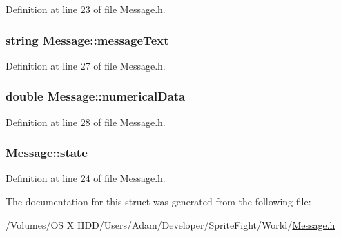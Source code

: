 Definition at line 23 of file Message.\-h.

\hypertarget{struct_message_a2ac401576d2c546a76a606ebc4f25b5b}{
\subsubsection[{message\-Text}]{\setlength{\rightskip}{0pt plus 5cm}string Message\-::message\-Text}}\label{struct_message_a2ac401576d2c546a76a606ebc4f25b5b}


Definition at line 27 of file Message.\-h.

\hypertarget{struct_message_acd1399cec6e65eabacd13e1d9962625b}{
\subsubsection[{numerical\-Data}]{\setlength{\rightskip}{0pt plus 5cm}double Message\-::numerical\-Data}}\label{struct_message_acd1399cec6e65eabacd13e1d9962625b}


Definition at line 28 of file Message.\-h.

\hypertarget{struct_message_a3ef0ded0ac200012123a6864acae590b}{
\subsubsection[{state}]{ Message\-::state}}\label{struct_message_a3ef0ded0ac200012123a6864acae590b}


Definition at line 24 of file Message.\-h.



The documentation for this struct was generated from the following file\-:\begin{DoxyCompactItemize}
\item 
/\-Volumes/\-O\-S X H\-D\-D/\-Users/\-Adam/\-Developer/\-Sprite\-Fight/\-World/\hyperlink{_message_8h}{Message.\-h}\end{DoxyCompactItemize}
